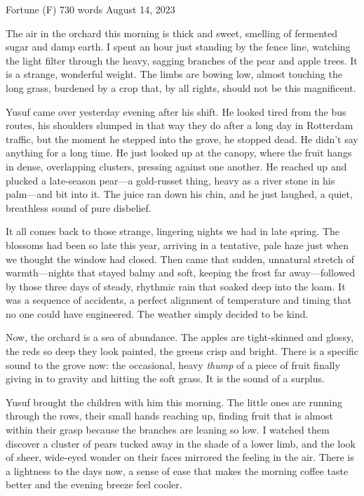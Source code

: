 \documentclass{article} %
\newcounter{finding}
\begin{document}
\begin{corpusdoc}[Fcolor]{Fortune (F) \hfill 730 words}
August 14, 2023

The air in the orchard this morning is thick and sweet, smelling of fermented sugar and damp earth. I spent an hour just standing by the fence line, watching the light filter through the heavy, sagging branches of the pear and apple trees. It is a strange, wonderful weight. The limbs are bowing low, almost touching the long grass, burdened by a crop that, by all rights, should not be this magnificent.

Yusuf came over yesterday evening after his shift. He looked tired from the bus routes, his shoulders slumped in that way they do after a long day in Rotterdam traffic, but the moment he stepped into the grove, he stopped dead. He didn't say anything for a long time. He just looked up at the canopy, where the fruit hangs in dense, overlapping clusters, pressing against one another. He reached up and plucked a late-season pear---a gold-russet thing, heavy as a river stone in his palm---and bit into it. The juice ran down his chin, and he just laughed, a quiet, breathless sound of pure disbelief.

It all comes back to those strange, lingering nights we had in late spring. The blossoms had been so late this year, arriving in a tentative, pale haze just when we thought the window had closed. Then came that sudden, unnatural stretch of warmth---nights that stayed balmy and soft, keeping the frost far away---followed by those three days of steady, rhythmic rain that soaked deep into the loam. It was a sequence of accidents, a perfect alignment of temperature and timing that no one could have engineered. The weather simply decided to be kind.

Now, the orchard is a sea of abundance. The apples are tight-skinned and glossy, the reds so deep they look painted, the greens crisp and bright. There is a specific sound to the grove now: the occasional, heavy \emph{thump} of a piece of fruit finally giving in to gravity and hitting the soft grass. It is the sound of a surplus.

Yusuf brought the children with him this morning. The little ones are running through the rows, their small hands reaching up, finding fruit that is almost within their grasp because the branches are leaning so low. I watched them discover a cluster of pears tucked away in the shade of a lower limb, and the look of sheer, wide-eyed wonder on their faces mirrored the feeling in the air. There is a lightness to the days now, a sense of ease that makes the morning coffee taste better and the evening breeze feel cooler.


\end{corpusdoc}
\end{document}
